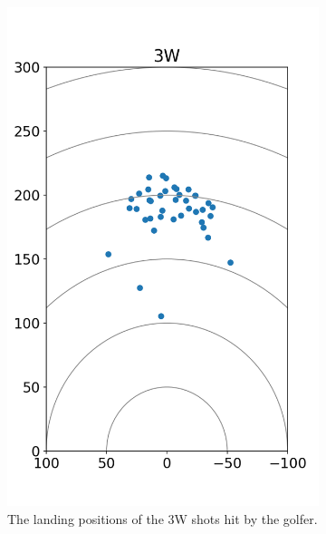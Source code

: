\documentclass{kththesis}
\begin{document}
\begin{figure}
\begin{subfigure}{0.4\textwidth}
    \includegraphics[height=0.4\textheight]{Shots/3W_shots.png} 
    \caption{The landing positions of the 3W shots hit by the golfer.}
    \label{fig:3W_shots}
    \end{subfigure}
    \begin{subfigure}{0.4\textwidth}
    \centering

\end{subfigure}
\end{figure}
\end{document}
